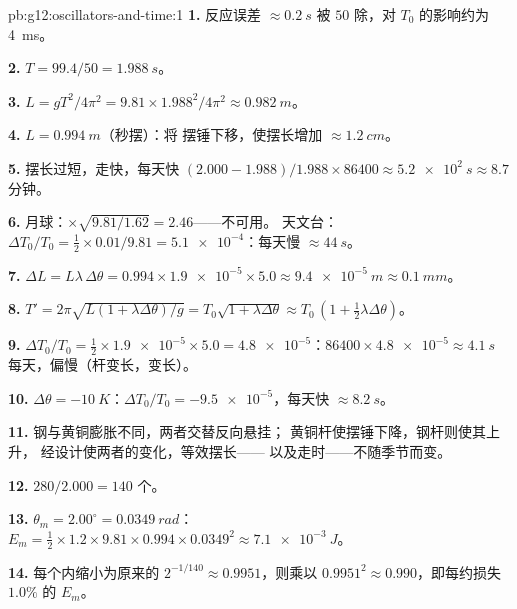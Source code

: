 \begin{solution}{pb:g12:oscillators-and-time:1}
\textbf{1.} 反应误差 $\approx \qty{0.2}{s}$ 被
$50$ 除，对 $T_0$ 的影响约为 \qty{4}{ms}。

\textbf{2.} $T = 99.4/50 = \qty{1.988}{s}$。

\textbf{3.} $L = gT^2/4\pi^2 = 9.81 \times 1.988^2/4\pi^2 \approx
\qty{0.982}{m}$。

\textbf{4.} $L = \qty{0.994}{m}$（秒摆）：将
摆锤下移，使摆长增加 $\approx \qty{1.2}{cm}$。

\textbf{5.} 摆长过短，走快，每天快 $(2.000 -
1.988)/1.988 \times 86400 \approx \qty{5.2e2}{s} \approx 8.7$
分钟。

\textbf{6.} 月球：$\times\sqrt{9.81/1.62} = 2.46$——不可用。
天文台：$\Delta T_0/T_0 = \tfrac12 \times 0.01/9.81 =
\num{5.1e-4}$：每天慢 $\approx \qty{44}{s}$。

\textbf{7.} $\Delta L = L\lambda\,\Delta\theta = 0.994 \times
\num{1.9e-5} \times 5.0 \approx \qty{9.4e-5}{m} \approx
\qty{0.1}{mm}$。

\textbf{8.} $T' = 2\pi\sqrt{L(1 + \lambda\Delta\theta)/g} =
T_0\sqrt{1 + \lambda\Delta\theta} \approx T_0\,(1 + \tfrac12
\lambda\Delta\theta)$。

\textbf{9.} $\Delta T_0/T_0 = \tfrac12 \times \num{1.9e-5} \times
5.0 = \num{4.8e-5}$：$86400 \times \num{4.8e-5} \approx
\qty{4.1}{s}$ 每天，偏慢（杆变长，变长）。

\textbf{10.} $\Delta\theta = \qty{-10}{K}$：$\Delta T_0/T_0 =
\num{-9.5e-5}$，每天快 $\approx \qty{8.2}{s}$。

\textbf{11.} 钢与黄铜膨胀不同，两者交替反向悬挂；
黄铜杆使摆锤下降，钢杆则使其上升，
经设计使两者的变化，等效摆长——
以及走时——不随季节而变。

\textbf{12.} $280/2.000 = 140$ 个。

\textbf{13.} $\theta_m = 2.00^\circ = \qty{0.0349}{rad}$：$E_m =
\tfrac12 \times 1.2 \times 9.81 \times 0.994 \times 0.0349^2 \approx
\qty{7.1e-3}{J}$。

\textbf{14.} 每个内缩小为原来的 $2^{-1/140} \approx
0.9951$，则乘以 $0.9951^2 \approx 0.990$，即每约损失 $1.0\%$
的 $E_m$。


\end{solution}
